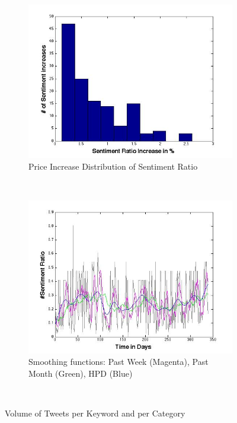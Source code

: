 \begin{figure}[ht]
        \centering
        \begin{subfigure}[b]{0.5\textwidth}
                \includegraphics[width=\textwidth]{img/model/sentiment_increase}
                \caption{Price Increase Distribution of Sentiment Ratio}
                \label{fig:inc_dist}
        \end{subfigure}%
        ~ %
        \begin{subfigure}[b]{0.5\textwidth}
                \includegraphics[width=\textwidth]{img/model/smoothing_variance}
                \caption{Smoothing functions: Past Week (Magenta), Past Month (Green), HPD (Blue)}
                \label{fig:s_effect}
        \end{subfigure}
        ~ %

      
        \caption{Volume of Tweets per Keyword and per Category}\label{fig:distribution}
\end{figure}






